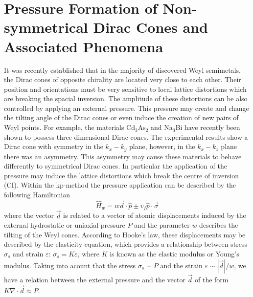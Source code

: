 \documentclass[prb,twocolumn,aps,superscriptaddress,showpacs,floatfix]{revtex4}
\begin{document}
\section{Pressure Formation of Non-symmetrical Dirac Cones and Associated Phenomena}
	It was recently established that in the majority of discovered Weyl semimetals, the Dirac cones of opposite chirality are located very close to each other. Their position and orientations must be very sensitive to local lattice distortions which are breaking the spacial inversion. The amplitude of these distortions can be also controlled by applying an external pressure. This pressure may create and change the tilting angle of the Dirac cones or even induce the creation of new pairs of Weyl points. For example, the materials Cd$_{3}$As$_{2}$ \cite{b34,p2,b35} and Na$_{3}$Bi \cite{b29} have recently been shown to possess three-dimensional Dirac cones. The experimental results show a Dirac cone with symmetry in the $k_{x}-k_{y}$ plane, however, in the $k_{x}-k_{z}$ plane there was an asymmetry. This asymmetry may cause these materials to behave differently to symmetrical Dirac cones. In particular the application of the pressure may induce the lattice distortions which break the centre of inversion (CI). Within the kp-method the pressure application can be described by the following Hamiltonian
	\begin{equation}
		 \hat{H}_w=w \vec{d}\cdot \hat{p} \pm v_{f}\hat{p}\cdot\vec{\sigma} 
	\end{equation}
where the vector $\vec{d}$ is related to a vector of atomic displacements induced by the external hydrostatic or uniaxial pressure $P$ and the parameter $w$ describes the tilting of the Weyl cones. According to Hooke's law, these displacements may be described by the elasticity equation, which provides a relationship between stress $\sigma_{s}$ and strain $\varepsilon$:  $\sigma_{s}= K\varepsilon$, where $K$ is known as the elastic modulus or Young's modulus. Taking into acount that the stress $\sigma_{s} \sim P$ and the strain $\varepsilon\sim |\vec{d}|/w$, we have a relation between the external pressure and the vector $\vec{d}$ of the form $ K \nabla\cdot \vec{d} \approx P$. 
\end{document}
